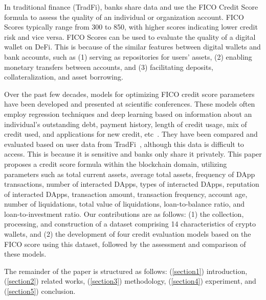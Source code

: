 \documentclass[../ICIT-Paper-2024.tex]{subfiles}
\begin{document}
In traditional finance (TradFi), banks share data and use the FICO Credit Score formula to assess the quality of an individual or organization account. FICO Scores typically range from 300 to 850, with higher scores indicating lower credit risk and vice versa. FICO Scores can be used to evaluate the quality of a digital wallet on DeFi. This is because of the similar features between digital wallets and bank accounts, such as (1) serving as repositories for users' assets, (2) enabling monetary transfers between accounts, and (3) facilitating deposits, collateralization, and asset borrowing.


Over the past few decades, models for optimizing FICO credit score parameters have been developed and presented at scientific conferences. These models often employ regression techniques and deep learning based on information about an individual's outstanding debt, payment history, length of credit usage, mix of credit used, and applications for new credit, etc~\cite{homonoff2021does}. They have been compared and evaluated based on user data from TradFi~\cite{munkhdalai2019empirical}, although this data is difficult to access. This is because it is sensitive and banks only share it privately.
This paper proposes a credit score formula within the blockchain domain, utilizing parameters such as total current assets, average total assets, frequency of DApp transactions, number of interacted DApps, types of interacted DApps, reputation of interacted DApps, transaction amount, transaction frequency, account age, number of liquidations, total value of liquidations, loan-to-balance ratio, and loan-to-investment ratio. Our contributions are as follows: (1) the collection, processing, and construction of a dataset comprising 14 characteristics of crypto wallets, and (2) the development of four credit evaluation models based on the FICO score using this dataset, followed by the assessment and comparison of these models.

The remainder of the paper is structured as follows: (\ref{section1}) introduction, (\ref{section2}) related works, (\ref{section3}) methodology, (\ref{section4}) experiment, and (\ref{section5}) conclusion.
\end{document}
